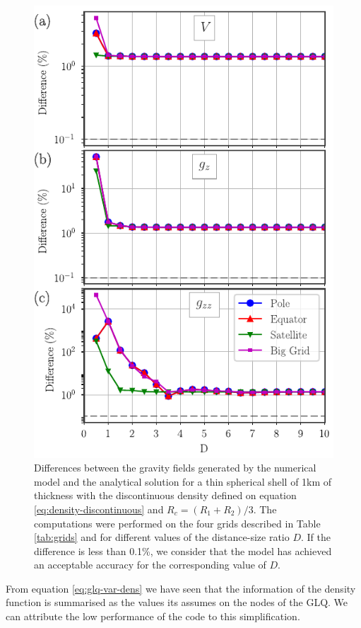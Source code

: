 \documentclass[extra]{gji}
\begin{document}
\begin{figure}
\centering
\includegraphics[width=0.9\linewidth]{figures/Ddiscontinuous-asymmetric-differences.pdf}
\caption{
    Differences between the gravity fields generated by the numerical model and the analytical solution for a thin spherical shell of 1km of thickness with the discontinuous density defined on equation \ref{eq:density-discontinuous} and $R_c=(R_1 + R_2)/3$. The computations were performed on the four grids described in Table \ref{tab:grids} and for different values of the distance-size ratio $D$. If the difference is less than 0.1\%, we consider that the model has achieved an acceptable accuracy for the corresponding value of $D$.
}
\label{fig:D-discont-asym}
\end{figure}

From equation \ref{eq:glq-var-dens} we have seen that the information of the density function is summarised as the values its assumes on the nodes of the GLQ.
We can attribute the low performance of the code to this simplification.
\end{document}
